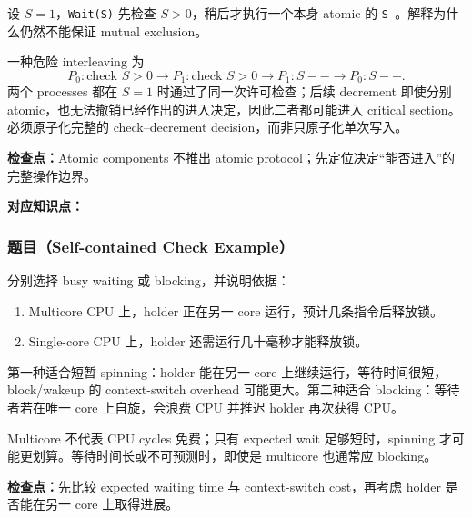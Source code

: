 设 $S=1$，\texttt{Wait(S)} 先检查 $S>0$，稍后才执行一个本身 atomic 的 \texttt{S--}。解释为什么仍然不能保证 mutual exclusion。

\begin{checkedsolution}
一种危险 interleaving 为
\[
  P_0:\text{check }S>0
  \rightarrow
  P_1:\text{check }S>0
  \rightarrow
  P_1:S--
  \rightarrow
  P_0:S--.
\]
两个 processes 都在 $S=1$ 时通过了同一次许可检查；后续 decrement 即使分别 atomic，也无法撤销已经作出的进入决定，因此二者都可能进入 critical section。必须原子化完整的 check--decrement decision，而非只原子化单次写入。
\end{checkedsolution}

\textbf{检查点：}Atomic components 不推出 atomic protocol；先定位决定“能否进入”的完整操作边界。


\textbf{对应知识点：}

\subsubsection*{题目（Self-contained Check Example）}

分别选择 busy waiting 或 blocking，并说明依据：
\begin{enumerate}
  \item Multicore CPU 上，holder 正在另一 core 运行，预计几条指令后释放锁。
  \item Single-core CPU 上，holder 还需运行几十毫秒才能释放锁。
\end{enumerate}

\begin{checkedsolution}
第一种适合短暂 spinning：holder 能在另一 core 上继续运行，等待时间很短，block/wakeup 的 context-switch overhead 可能更大。第二种适合 blocking：等待者若在唯一 core 上自旋，会浪费 CPU 并推迟 holder 再次获得 CPU。

Multicore 不代表 CPU cycles 免费；只有 expected wait 足够短时，spinning 才可能更划算。等待时间长或不可预测时，即使是 multicore 也通常应 blocking。
\end{checkedsolution}

\textbf{检查点：}先比较 expected waiting time 与 context-switch cost，再考虑 holder 是否能在另一 core 上取得进展。
